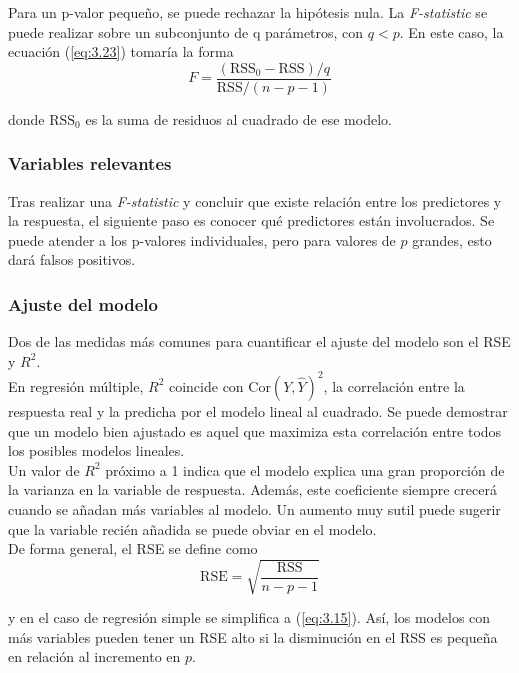 Para un p-valor pequeño, se puede rechazar la hipótesis nula. La \textit{F-statistic} se puede realizar sobre un subconjunto de q parámetros, con $q < p$. En este caso, la ecuación (\ref{eq:3.23}) tomaría la forma 
\begin{equation}
F = \frac{(\text{RSS}_0 - \text{RSS})/q}{\text{RSS}/(n - p - 1)}
\end{equation}

\noindent donde $\text{RSS}_0$ es la suma de residuos al cuadrado de ese modelo.

\subsubsection{Variables relevantes}

Tras realizar una \textit{F-statistic} y concluir que existe relación entre los predictores y la respuesta, el siguiente paso es conocer qué predictores están involucrados. Se puede atender a los p-valores individuales, pero para valores de $p$ grandes, esto dará falsos positivos. 

\subsubsection{Ajuste del modelo}

Dos de las medidas más comunes para cuantificar el ajuste del modelo son el RSE y $R^2$. \\

En regresión múltiple, $R^2$ coincide con $\text{Cor}(Y, \hat{Y})^2$, la correlación entre la respuesta real y la predicha por el modelo lineal al cuadrado. Se puede demostrar que un modelo bien ajustado es aquel que maximiza esta correlación entre todos los posibles modelos lineales. \\

Un valor de $R^2$ próximo a 1 indica que el modelo explica una gran proporción de la varianza en la variable de respuesta. Además, este coeficiente siempre crecerá cuando se añadan más variables al modelo. Un aumento muy sutil puede sugerir que la variable recién añadida se puede obviar en el modelo. \\

\noindent De forma general, el RSE se define como 
\begin{equation}
\text{RSE} = \sqrt{\frac{\text{RSS}}{n - p - 1}}
\end{equation}

\noindent y en el caso de regresión simple se simplifica a (\ref{eq:3.15}). Así, los modelos con más variables pueden tener un RSE alto si la disminución en el RSS es pequeña en relación al incremento en $p$.

